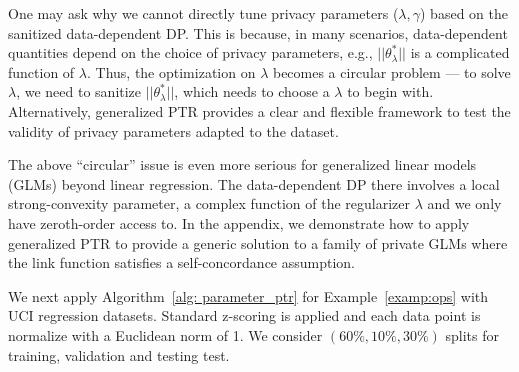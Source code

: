 One may ask why we cannot directly tune privacy parameters ($\lambda, \gamma$) based on the sanitized data-dependent DP. This is because, in many scenarios, data-dependent quantities depend on the choice of privacy parameters, e.g., $||\theta_\lambda^*||$ is a complicated function of $\lambda$. Thus, the optimization on $\lambda$ becomes a circular problem --- to solve $\lambda$, we need to sanitize $||\theta_
\lambda^*||$, which needs to choose a $\lambda$ to begin with. Alternatively, generalized PTR provides a clear and flexible framework to test the validity of privacy parameters adapted to the dataset. 

\begin{remark}
The above ``circular'' issue is even more serious for generalized linear models (GLMs) beyond linear regression. The data-dependent DP there involves a local strong-convexity parameter, a complex function of the regularizer $\lambda$  and we only have zeroth-order access to. In the appendix, we demonstrate how to apply generalized PTR to provide a generic solution to a family of private GLMs where the link function satisfies a self-concordance assumption.
\end{remark}

We next apply Algorithm~\ref{alg: parameter_ptr} for Example~\ref{examp:ops}  with UCI regression datasets. Standard z-scoring is applied and each data point is normalize with a Euclidean norm of 1.  We consider $(60\%,10\%,30\%)$ splits for training, validation and testing test.

